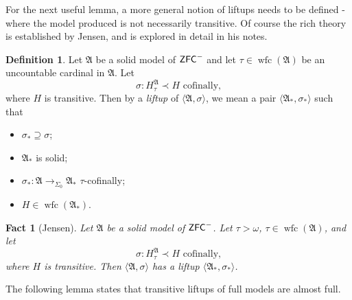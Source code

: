 \documentclass{amsart}
\newtheorem{fact}[theorem]{Fact}
\theoremstyle{definition}
\newtheorem{definition}[theorem]{Definition}
\theoremstyle{remark}
\newcommand{\ZFC}{\textup{\ensuremath{\textsf{ZFC}}}}
\DeclareMathOperator{\wfc}{wfc}
\newcommand{\To}{\longrightarrow}
\begin{document}
For the next useful lemma, a more general notion of liftups needs to be defined - where the model produced is not necessarily transitive. Of course the rich theory is established by Jensen, and is explored in detail in his notes.
\begin{definition} Let $\mathfrak A$ be a solid model of $\ZFC^-$ and let $\tau \in \wfc(\mathfrak A)$ be an uncountable cardinal in $\mathfrak A$. Let $$\sigma: H_{\tau}^\mathfrak A \prec H \text{ cofinally,}$$ where $H$ is transitive. Then by a \textit{liftup} of $\langle \mathfrak A, \sigma\rangle$, we mean a pair $\langle {\mathfrak A}_*, \sigma_* \rangle$ such that 
\begin{itemize}
	\item $\sigma_* \supseteq \sigma$;
	\item ${\mathfrak A}_*$ is solid;
	\item $\sigma_*: \mathfrak A \To_{\Sigma_0} {\mathfrak A}_*$ $\tau$-cofinally;
	\item $H \in \wfc({\mathfrak A}_*)$. \qedhere
\end{itemize}
\end{definition}
\begin{fact}[Jensen]\label{fact:solidliftup} Let $\mathfrak A$ be a solid model of $\ZFC^-$. Let $\tau > \omega$, $\tau \in \wfc(\mathfrak A)$, and let $$\sigma: H_{\tau}^{\mathfrak A} \prec H \text{ cofinally,}$$  where $H$ is transitive. Then $\langle \mathfrak A, \sigma \rangle$ has a liftup $\langle \mathfrak A_*, \sigma_* \rangle$.
\end{fact}

The following lemma states that transitive liftups of full models are almost full.
\end{document}
